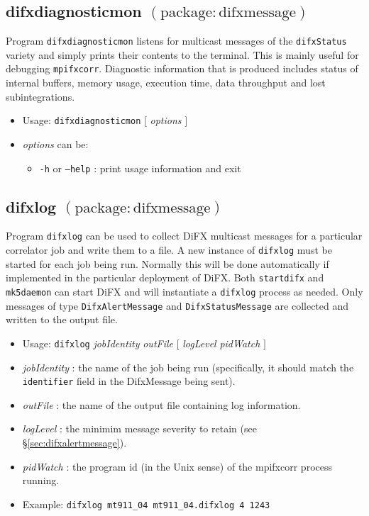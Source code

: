 
\subsection{difxdiagnosticmon {\small $\mathrm{(package: difxmessage)}$}} \label{sec:difxdiagnosticmon} 

Program {\tt difxdiagnosticmon} listens for multicast messages of the {\tt difxStatus} variety and simply prints their contents to the terminal.
This is mainly useful for debugging {\tt mpifxcorr}.
Diagnostic information that is produced includes status of internal buffers, memory usage, execution time, data throughput and lost subintegrations.

\begin{itemize}
\item[] Usage: {\tt difxdiagnosticmon} $[$ {\em options} $]$ 
\item[] {\em options} can be:
\begin{itemize}
\item[] {\tt -h} or {\tt --help} : print usage information and exit
\end{itemize}
\end{itemize}






\subsection{difxlog {\small $\mathrm{(package: difxmessage)}$}} \label{sec:difxlogprogram} 

Program {\tt difxlog} can be used to collect DiFX multicast messages for a particular correlator job and write them to a file.
A new instance of {\tt difxlog} must be started for each job being run.
Normally this will be done automatically if implemented in the particular deployment of DiFX.
Both {\tt startdifx} and {\tt mk5daemon} can start DiFX and will instantiate a {\tt difxlog} process as needed.
Only messages of type {\tt DifxAlertMessage} and {\tt DifxStatusMessage} are collected and written to the output file.

\begin{itemize}
\item[] Usage: {\tt difxlog} {\em jobIdentity} {\em outFile} $[$ {\em logLevel} {\em pidWatch} $]$ 
\item[] {\em jobIdentity} : the name of the job being run (specifically, it should match the {\tt identifier} field in the DifxMessage being sent).
\item[] {\em outFile} : the name of the output file containing log information.
\item[] {\em logLevel} : the minimim message severity to retain (see \S\ref{sec:difxalertmessage}).
\item[] {\em pidWatch} : the program id (in the Unix sense) of the mpifxcorr process running.
\item[] Example: {\tt difxlog mt911\_04 mt911\_04.difxlog 4 1243}
\end{itemize}

